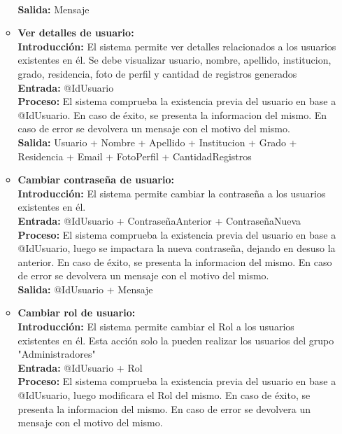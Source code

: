 \begin{enumerate}[A.]
\begin{itemize}
            \\ \textbf{Salida:} Mensaje
            \\
          \item \textbf{Ver detalles de usuario:}
            \\ \textbf{Introducción:} El sistema permite ver detalles relacionados a los usuarios existentes en él. Se debe visualizar usuario, nombre, apellido, institucion, grado, residencia, foto de perfil y cantidad de registros generados
            \\ \textbf{Entrada:} @IdUsuario
            \\ \textbf{Proceso:} El sistema comprueba la existencia previa del usuario en base a @IdUsuario. En caso de éxito, se presenta la informacion del mismo. En caso de error se devolvera un mensaje con el motivo del mismo.
            \\ \textbf{Salida:} Usuario + Nombre + Apellido + Institucion + Grado + Residencia + Email + FotoPerfil + CantidadRegistros
            \\
          \item \textbf{Cambiar contraseña de usuario:}
            \\ \textbf{Introducción:} El sistema permite cambiar la contraseña a los usuarios existentes en él.
            \\ \textbf{Entrada:} @IdUsuario + ContraseñaAnterior + ContraseñaNueva
            \\ \textbf{Proceso:} El sistema comprueba la existencia previa del usuario en base a @IdUsuario, luego se impactara la nueva contraseña, dejando en desuso la anterior. En caso de éxito, se presenta la informacion del mismo. En caso de error se devolvera un mensaje con el motivo del mismo.
            \\ \textbf{Salida:} @IdUsuario + Mensaje
            \\
          \item \textbf{Cambiar rol de usuario:}
            \\ \textbf{Introducción:} El sistema permite cambiar el Rol a los usuarios existentes en él. Esta acción solo la pueden realizar los usuarios del grupo "Administradores"
            \\ \textbf{Entrada:} @IdUsuario + Rol
            \\ \textbf{Proceso:} El sistema comprueba la existencia previa del usuario en base a @IdUsuario, luego modificara el Rol del mismo. En caso de éxito, se presenta la informacion del mismo. En caso de error se devolvera un mensaje con el motivo del mismo.

\end{itemize}
\end{enumerate}
